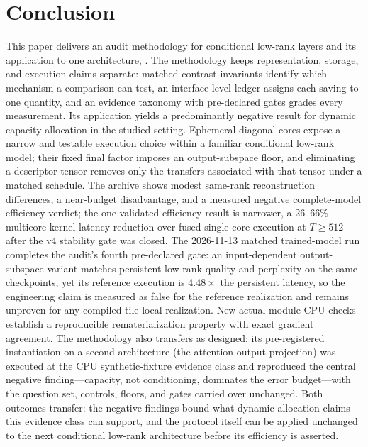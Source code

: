 \section{Conclusion}
This paper delivers an audit methodology for conditional low-rank layers and
its application to one architecture, \mwg{}. The methodology keeps
representation, storage, and execution claims separate: matched-contrast
invariants identify which mechanism a comparison can test, an interface-level
ledger assigns each saving to one quantity, and an evidence taxonomy with
pre-declared gates grades every measurement. Its application yields a
predominantly negative result for dynamic capacity allocation in the studied
setting. Ephemeral diagonal cores expose a narrow and testable execution
choice within a familiar conditional low-rank model; their fixed final factor
imposes an output-subspace floor, and eliminating a descriptor tensor removes
only the transfers associated with that tensor under a matched schedule. The
archive shows modest same-rank reconstruction differences, a near-budget
disadvantage, and a measured negative complete-model efficiency verdict; the
one validated efficiency result is narrower, a 26--66\% multicore kernel-latency
reduction over fused single-core execution at $T\ge512$ after the v4
stability gate was closed. The 2026-11-13 matched trained-model run
completes the audit's fourth pre-declared gate: an input-dependent
output-subspace variant matches persistent-low-rank quality and perplexity
on the same checkpoints, yet its reference execution is $4.48\times$ the
persistent latency, so the engineering claim is measured as false for the
reference realization and remains unproven for any compiled tile-local
realization. New
actual-module CPU checks establish a reproducible rematerialization property
with exact gradient agreement. The methodology also transfers as designed:
its pre-registered instantiation on a second architecture (the attention
output projection) was executed at the CPU synthetic-fixture evidence class
and reproduced the central negative finding---capacity, not conditioning,
dominates the error budget---with the question set, controls, floors, and
gates carried over unchanged. Both outcomes transfer: the negative findings
bound what dynamic-allocation claims this evidence class can support, and the
protocol itself can be applied unchanged to the next conditional low-rank
architecture before its efficiency is asserted.


